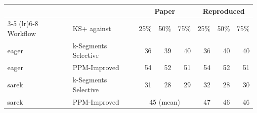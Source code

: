 \begin{tabular}{llrrrrrr}
\toprule
 & & \multicolumn{3}{c}{Paper} & \multicolumn{3}{c}{Reproduced} \\
\cmidrule(lr){3-5} \cmidrule(lr){6-8}
Workflow & KS+ against & 25\% & 50\% & 75\% & 25\% & 50\% & 75\% \\
\midrule
eager & k-Segments Selective & 36 & 39 & 40 & 36 & 40 & 40 \\
eager & PPM-Improved & 54 & 52 & 51 & 54 & 52 & 51 \\
sarek & k-Segments Selective & 31 & 28 & 29 & 32 & 28 & 30 \\
sarek & PPM-Improved & \multicolumn{3}{c}{45 (mean)} & 47 & 46 & 46 \\
\bottomrule
\end{tabular}
